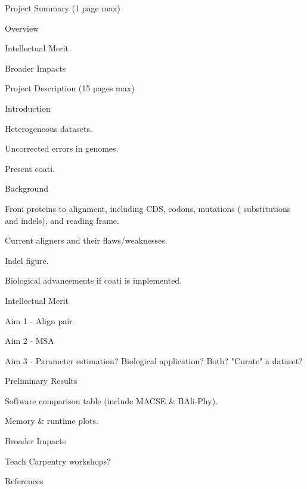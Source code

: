
\usepackage{outline}


\begin{outline}
	\item Project Summary (1 page max)
	\begin{outline}
		\item Overview
		\item Intellectual Merit
		\item Broader Impacts
	\end{outline}
	\item Project Description (15 pages max)
	\begin{outline}
		\item Introduction
		\begin{outline}
			\item Heterogeneous datasets.
			\item Uncorrected errors in genomes.
			\item Present coati.
		\end{outline}
		\item Background
		\begin{outline}
			\item From proteins to alignment, including CDS, codons, mutations (
				substitutions and indels), and reading frame.
			\item Current aligners and their flaws/weaknesses.
			\item Indel figure.
			\item Biological advancements if coati is implemented.
		\end{outline}
		\item Intellectual Merit
		\begin{outline}
			\item Aim 1 - Align pair %
			\item Aim 2 - MSA        %
			\item Aim 3 - Parameter estimation? Biological application? Both? %
				"Curate" a dataset?
		\end{outline}
		\item Preliminary Results
		\begin{outline}
			\item Software comparison table (include MACSE \& BAli-Phy).
			\item Memory \& runtime plots.
		\end{outline}
		\item Broader Impacts
		\begin{outline}
			\item Teach Carpentry workshops?
		\end{outline}
		\item References
	\end{outline}
\end{outline}

